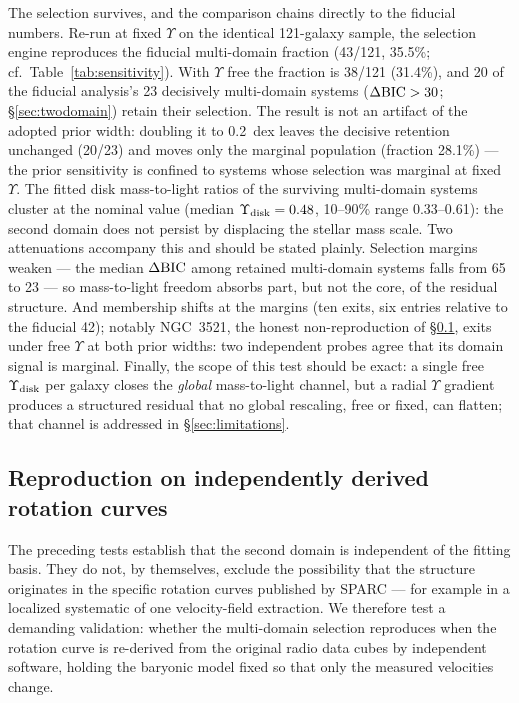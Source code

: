 \documentclass[twocolumn]{aastex701}
\begin{document}
The selection survives, and the comparison chains directly to the fiducial
numbers. Re-run at fixed $\Upsilon$ on the identical 121-galaxy sample, the
selection engine reproduces the fiducial multi-domain fraction (43/121,
35.5\%; cf.\ Table~\ref{tab:sensitivity}). With $\Upsilon$ free the fraction
is 38/121 (31.4\%), and 20 of the fiducial analysis's 23 decisively
multi-domain systems ($\Delta{\rm BIC} > 30$; \S\ref{sec:twodomain}) retain
their selection. The result is not an artifact of the adopted prior width:
doubling it to 0.2~dex leaves the decisive retention unchanged (20/23) and
moves only the marginal population (fraction 28.1\%) --- the prior
sensitivity is confined to systems whose selection was marginal at fixed
$\Upsilon$. The fitted disk mass-to-light ratios of the surviving
multi-domain systems cluster at the nominal value (median
$\Upsilon_{\rm disk} = 0.48$, 10--90\% range 0.33--0.61): the second domain
does not persist by displacing the stellar mass scale. Two attenuations
accompany this and should be stated plainly. Selection margins weaken ---
the median $\Delta{\rm BIC}$ among retained multi-domain systems falls from
65 to 23 --- so mass-to-light freedom absorbs part, but not the core, of the
residual structure. And membership shifts at the margins (ten exits, six
entries relative to the fiducial 42); notably NGC~3521, the honest
non-reproduction of \S\ref{sec:dataindep}, exits under free $\Upsilon$ at
both prior widths: two independent probes agree that its domain signal is
marginal. Finally, the scope of this test should be exact: a single free
$\Upsilon_{\rm disk}$ per galaxy closes the \emph{global} mass-to-light
channel, but a radial $\Upsilon$ gradient produces a structured residual
that no global rescaling, free or fixed, can flatten; that channel is
addressed in \S\ref{sec:limitations}.

\subsection{Reproduction on independently derived rotation curves} \label{sec:dataindep}

The preceding tests establish that the second domain is independent of the
fitting basis. They do not, by themselves, exclude the possibility that the
structure originates in the specific rotation curves published by SPARC --- for
example in a localized systematic of one velocity-field extraction. We therefore
test a demanding validation: whether the multi-domain
selection reproduces when the rotation curve is re-derived from the original
radio data cubes by independent software, holding the baryonic model fixed so
that only the measured velocities change.
\end{document}
